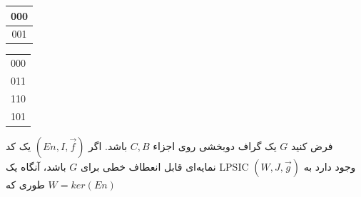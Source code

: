 \begin{example}
\begin{table}
\begin{minipage}{0.49\textwidth}
       	       \end{minipage}
       \begin{minipage}{0.25\textwidth}
			        		\begin{tabular}{|c|}
			        			\hline
			        			000 \\
			        			\hline
			        			001 \\
			        			\hline
			        		\end{tabular}
			        	\end{minipage}
			             \begin{minipage}{0.25\textwidth}
	 		       		\begin{tabular}{|c|}
	 		       			\hline
	 		       			000  \\
	 		       			011   \\
	 		       			110  \\
	 		       			101   \\
	 		       			\hline
	 		       		\end{tabular}
	 		       	       				        	\end{minipage}
	 		       	\end{table}

\end{example}

\begin{lemma}
    فرض کنید $G$ یک گراف دوبخشی روی اجزاء $C, B$ باشد. اگر $(En, I, \overrightarrow{f})$ یک کد نمایه‌ای قابل انعطاف خطی برای $G$ باشد، آنگاه یک LPSIC $(W, J, \overrightarrow{g})$ وجود دارد به طوری که $W  = ker(En)$
\end{lemma}

